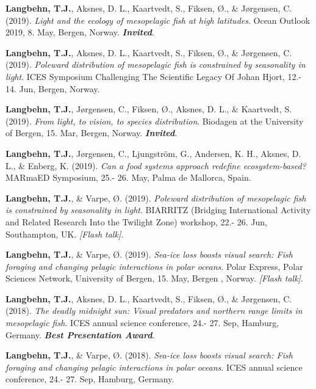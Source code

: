 \documentclass[11pt, a4paper]{awesome-cv}
\begin{document}
\leavevmode\hypertarget{ref-Langbehn6}{}%
\textbf{Langbehn, T.J.}, Aksnes, D. L., Kaartvedt, S., Fiksen, Ø., \&
Jørgensen, C. (2019). \emph{Light and the ecology of mesopelagic fish at
high latitudes}. Ocean Outlook 2019, 8. May, Bergen, Norway.
\emph{\textbf{Invited}}.

\leavevmode\hypertarget{ref-Langbehn9}{}%
\textbf{Langbehn, T.J.}, Aksnes, D. L., Kaartvedt, S., Fiksen, Ø., \&
Jørgensen, C. (2019). \emph{Poleward distribution of mesopelagic fish is
constrained by seasonality in light}. ICES Symposium Challenging The
Scientific Legacy Of Johan Hjort, 12.- 14. Jun, Bergen, Norway.

\leavevmode\hypertarget{ref-Langbehn5}{}%
\textbf{Langbehn, T.J.}, Jørgensen, C., Fiksen, Ø., Aksnes, D. L., \&
Kaartvedt, S. (2019). \emph{From light, to vision, to species
distribution}. Biodagen at the University of Bergen, 15. Mar, Bergen,
Norway. \emph{\textbf{Invited}}.

\leavevmode\hypertarget{ref-Langbehn8}{}%
\textbf{Langbehn, T.J.}, Jørgensen, C., Ljungström, G., Andersen, K. H.,
Aksnes, D. L., \& Enberg, K. (2019). \emph{Can a food systems approach
redefine ecosystem-based?} MARmaED Symposium, 25.- 26. May, Palma de
Mallorca, Spain.

\leavevmode\hypertarget{ref-Langbehn10}{}%
\textbf{Langbehn, T.J.}, \& Varpe, Ø. (2019). \emph{Poleward
distribution of mesopelagic fish is constrained by seasonality in
light}. BIARRITZ (Bridging International Activity and Related Research
Into the Twilight Zone) workshop, 22.- 26. Jun, Southampton, UK.
\emph{{[}Flash talk{]}}.

\leavevmode\hypertarget{ref-Langbehn7}{}%
\textbf{Langbehn, T.J.}, \& Varpe, Ø. (2019). \emph{Sea-ice loss boosts
visual search: Fish foraging and changing pelagic interactions in polar
oceans}. Polar Express, Polar Sciences Network, University of Bergen,
15. May, Bergen , Norway. \emph{{[}Flash talk{]}}.

\leavevmode\hypertarget{ref-Langbehn4}{}%
\textbf{Langbehn, T.J.}, Aksnes, D. L., Kaartvedt, S., Fiksen, Ø., \&
Jørgensen, C. (2018). \emph{The deadly midnight sun: Visual predators
and northern range limits in mesopelagic fish}. ICES annual science
conference, 24.- 27. Sep, Hamburg, Germany. \emph{\textbf{Best
Presentation Award}}.

\leavevmode\hypertarget{ref-Langbehn3}{}%
\textbf{Langbehn, T.J.}, \& Varpe, Ø. (2018). \emph{Sea-ice loss boosts
visual search: Fish foraging and changing pelagic interactions in polar
oceans}. ICES annual science conference, 24.- 27. Sep, Hamburg, Germany.
\end{document}
